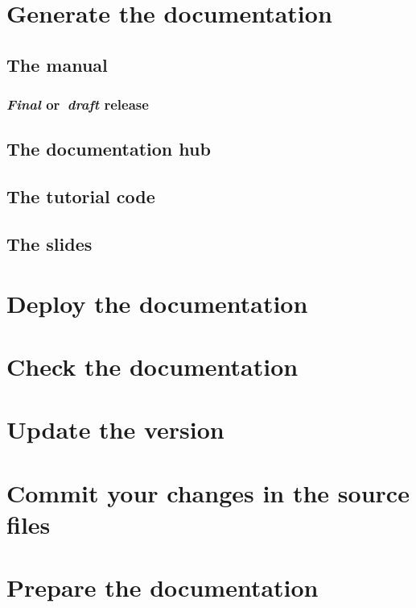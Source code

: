 \documentclass[a4paper,10pt]{article}
\begin{document}
\section{Generate the documentation}
\label{generate_documentation}

\subsection{The manual}

\subsubsection{\emph{Final} or~\emph{draft} release}
\label{final_draft_mode}

\subsection{The documentation hub}

\subsection{The tutorial code}

\subsection{The slides}

\section{Deploy the documentation}
\label{deploy_documentation}

\section{Check the documentation}
\label{check_documentation}

\section{Update the version}
\label{update_version}

\section{Commit your changes in the source files}
\label{commit_source_files}

\section{Prepare the documentation}
\label{prepare_documentation}
\end{document}
